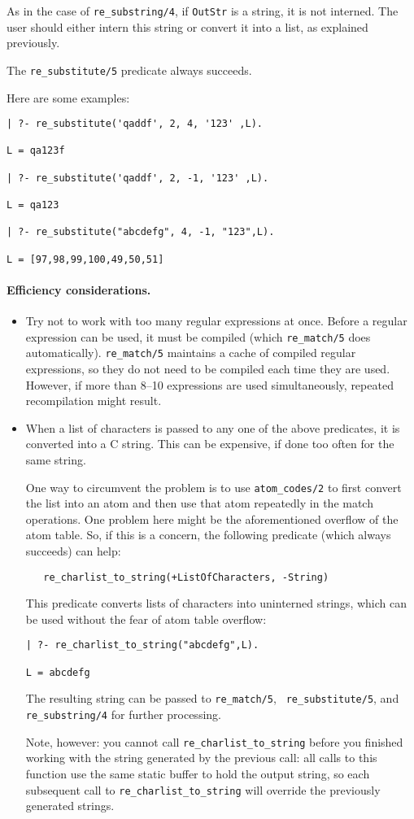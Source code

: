 As in the case of {\tt re\_substring/4}, if {\tt OutStr} is a string, it is
not interned.  The user should either intern this string or convert it into
a list, as explained previously.

The \verb|re_substitute/5| predicate always succeeds.

Here are some examples:
\begin{verbatim}
| ?- re_substitute('qaddf', 2, 4, '123' ,L).

L = qa123f

| ?- re_substitute('qaddf', 2, -1, '123' ,L).

L = qa123

| ?- re_substitute("abcdefg", 4, -1, "123",L).

L = [97,98,99,100,49,50,51]
\end{verbatim}

\paragraph{Efficiency considerations.}
\begin{itemize}
  \item  Try not to work with too many regular expressions at once.
    Before a regular expression can be used, it must be compiled (which
    {\tt re\_match/5} does automatically).
    {\tt re\_match/5} maintains a cache of compiled regular expressions, so
    they do not need to be compiled each time they are used. However, if
    more than 8--10 expressions are used simultaneously, repeated
    recompilation might result.
  \item When a list of characters is passed to any one of the above
    predicates, it is converted into a C string. This can be expensive, if
    done too often for the same string.
    
    One way to circumvent the problem is to use {\tt atom\_codes/2} to
    first convert the list into an atom and then use that atom repeatedly
    in the match operations. One problem here might be the aforementioned
    overflow of the atom table. So, if this is a concern, the following
    predicate (which always succeeds) can help:
\begin{verbatim}
   re_charlist_to_string(+ListOfCharacters, -String)  
\end{verbatim}
    This predicate converts lists of characters into uninterned strings,
    which can be used without the fear of atom table overflow:
\begin{verbatim}
| ?- re_charlist_to_string("abcdefg",L).

L = abcdefg  
\end{verbatim}
    The resulting string can be passed to {\tt re\_match/5}, {\tt
    re\_substitute/5}, and {\tt re\_substring/4} for further processing.
  
  Note, however: you cannot call {\tt re\_charlist\_to\_string} before you
  finished working with the string generated by the previous call: all
  calls to this function use the same static buffer to hold the output
  string, so each subsequent call to {\tt re\_charlist\_to\_string} will
  override the previously generated strings.
\end{itemize}


